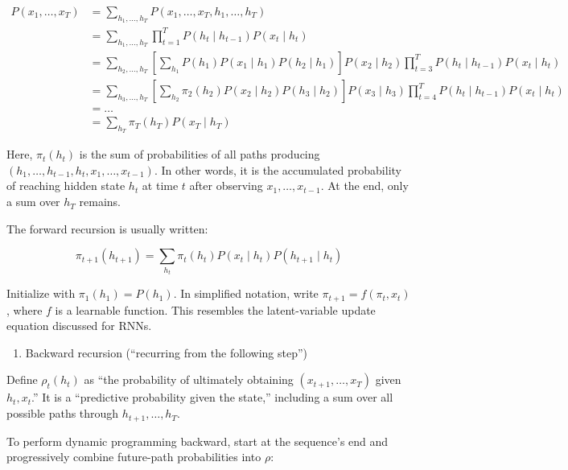 \[
\begin{aligned}
P(x_1, \ldots, x_T)
&= \sum_{h_1,\ldots,h_T} P(x_1, \ldots, x_T, h_1, \ldots, h_T) \\
&= \sum_{h_1,\ldots,h_T} \prod_{t=1}^{T} P(h_t \mid h_{t-1})P(x_t \mid h_t) \\
&= \sum_{h_2,\ldots,h_T}\left[\sum_{h_1}P(h_1)P(x_1 \mid h_1)P(h_2 \mid h_1)\right]P(x_2 \mid h_2)\prod_{t=3}^{T}P(h_t \mid h_{t-1})P(x_t \mid h_t) \\
&= \sum_{h_3,\ldots,h_T}\left[\sum_{h_2}\pi_2(h_2)P(x_2 \mid h_2)P(h_3 \mid h_2)\right]P(x_3 \mid h_3)\prod_{t=4}^{T}P(h_t \mid h_{t-1})P(x_t \mid h_t) \\
&= \ldots \\
&= \sum_{h_T}\pi_T(h_T)P(x_T \mid h_T)
\end{aligned}
\]

Here, \(\pi_t(h_t)\) is the sum of probabilities of all paths producing \((h_1, \ldots, h_{t-1}, h_t, x_1, \ldots, x_{t-1})\). In other words, it is the accumulated probability of reaching hidden state \(h_t\) at time \(t\) after observing \(x_1, \ldots, x_{t-1}\). At the end, only a sum over \(h_T\) remains.

The forward recursion is usually written:

\[
\pi_{t+1}(h_{t+1}) = \sum_{h_t}\pi_t(h_t)P(x_t \mid h_t)P(h_{t+1} \mid h_t)
\]

Initialize with \(\pi_1(h_1) = P(h_1)\). In simplified notation, write \(\pi_{t+1} = f(\pi_t, x_t)\), where \(f\) is a learnable function. This resembles the latent-variable update equation discussed for RNNs.

\begin{enumerate}
\def\labelenumi{\arabic{enumi}.}
\setcounter{enumi}{1}
\tightlist
\item
  Backward recursion (``recurring from the following step'')
\end{enumerate}

Define \(\rho_t(h_t)\) as ``the probability of ultimately obtaining \((x_{t+1}, \ldots, x_T)\) given \(h_t, x_t\).'' It is a ``predictive probability given the state,'' including a sum over all possible paths through \(h_{t+1}, \ldots, h_T\).

To perform dynamic programming backward, start at the sequence's end and progressively combine future-path probabilities into \(\rho\):

